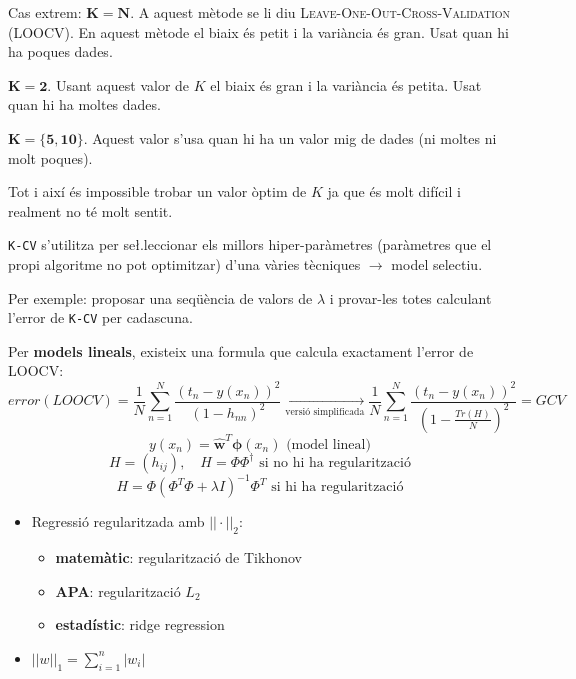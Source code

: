 Cas extrem: $\boldsymbol{K=N}$. A aquest mètode se li diu \textsc{Leave-One-Out-Cross-Validation} (LOOCV). En aquest mètode el biaix és petit i la variància és gran. Usat quan hi ha poques dades.

$\boldsymbol{K=2}$. Usant aquest valor de $K$ el biaix és gran i la variància és petita. Usat quan hi ha moltes dades.

$\boldsymbol{K=\{5,10\}}$. Aquest valor s'usa quan hi ha un valor mig de dades (ni moltes ni molt poques).

Tot i així és impossible trobar un valor òptim de $K$ ja que és molt difícil i realment no té molt sentit.

\verb|K-CV| s'utilitza per se\l.leccionar els millors hiper-paràmetres (paràmetres que el propi algoritme no pot optimitzar) d'una vàries tècniques $\rightarrow$ model selectiu.

Per exemple: proposar una seqüència de valors de $\lambda$ i provar-les totes calculant l'error de \verb|K-CV| per cadascuna.

Per \textbf{models lineals}, existeix una formula que calcula exactament l'error de LOOCV:
$$
error(LOOCV) = \frac{1}{N} \sum_{n=1}^N \frac{\left(t_n - y(x_n)\right)^2}{(1 - h_{nn})^2} \underset{\text{versió simplificada}}{\longrightarrow}
\frac{1}{N} \sum_{n=1}^N \frac{(t_n - y(x_n))^2}{\left(1 - \frac{Tr(H)}{N}\right)^2} = GCV
$$
$$
y(x_n) = \hat{\boldsymbol{w}}^T \boldsymbol{\phi} (x_n) \text{ (model lineal)}
$$
$$
H = (h_{ij}), \quad H = \Phi \Phi^{\dag} \text{ si no hi ha regularització}
$$
$$
H = \Phi \left( \Phi^T \Phi + \lambda I \right)^{-1} \Phi^T \text{ si hi ha regularització}
$$

\begin{itemize}
	\item Regressió regularitzada amb $||·||_2$:
	\begin{itemize}
		\item \textbf{matemàtic}: regularització de Tikhonov
		\item \textbf{APA}: regularització $L_2$
		\item \textbf{estadístic}: ridge regression
	\end{itemize}
	\item $||w||_1 = \sum_{i=1}^n |w_i|$
	
\end{itemize}
